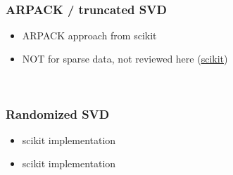 \ \clearpage


\subsubsection{ARPACK / truncated SVD}

\begin{itemize}
	\item \cite{wright2001large} ARPACK approach from scikit
	\item NOT for sparse data, not reviewed here (\href{https://scikit-learn.org/stable/modules/generated/sklearn.decomposition.PCA.html}{scikit})
\end{itemize}

\ \clearpage
\ \clearpage


\subsubsection{Randomized SVD}

\begin{itemize}
	\item \cite{halko2011finding} scikit implementation
	\item \cite{martinsson2011randomized} scikit implementation
\end{itemize}

\ \clearpage
\ \clearpage

